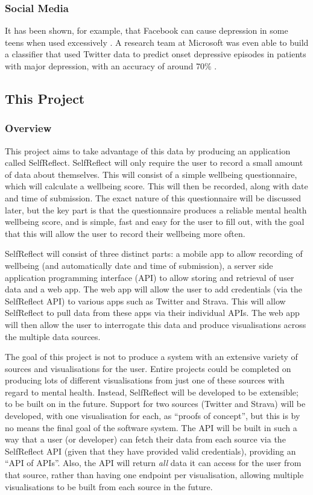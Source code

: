 \documentclass[11pt,openright,a4paper]{report}
\begin{document}
\subsubsection{Social Media}
It has been shown, for example, that Facebook can cause depression in some teens when used excessively \parencite{fbdepressionteens}. A research team at Microsoft was even able to build a classifier that used Twitter data to predict onset depressive episodes in patients with major depression, with an accuracy of around 70\% \parencite{de2013predicting}.

\subsection{This Project}
\subsubsection{Overview}
This project aims to take advantage of this data by producing an application called SelfReflect. SelfReflect will only require the user to record a small amount of data about themselves. This will consist of a simple wellbeing questionnaire, which will calculate a wellbeing score. This will then be recorded, along with date and time of submission. The exact nature of this questionnaire will be discussed later, but the key part is that the questionnaire produces a reliable mental health wellbeing score, and is simple, fast and easy for the user to fill out, with the goal that this will allow the user to record their wellbeing more often.

SelfReflect will consist of three distinct parts: a mobile app to allow recording of wellbeing (and automatically date and time of submission), a server side application programming interface (API) to allow storing and retrieval of user data and a web app. The web app will allow the user to add credentials (via the SelfReflect API) to various apps such as Twitter and Strava. This will allow SelfReflect to pull data from these apps via their individual APIs. The web app will then allow the user to interrogate this data and produce visualisations across the multiple data sources.

The goal of this project is not to produce a system with an extensive variety of sources and visualisations for the user. Entire projects could be completed on producing lots of different visualisations from just one of these sources with regard to mental health. Instead, SelfReflect will be developed to be extensible; to be built on in the future. Support for two sources (Twitter and Strava) will be developed, with one visualisation for each, as \enquote{proofs of concept}, but this is by no means the final goal of the software system. The API will be built in such a way that a user (or developer) can fetch their data from each source via the SelfReflect API (given that they have provided valid credentials), providing an \enquote{API of APIs}. Also, the API will return \emph{all} data it can access for the user from that source, rather than having one endpoint per visualisation, allowing multiple visualisations to be built from each source in the future.
\end{document}
